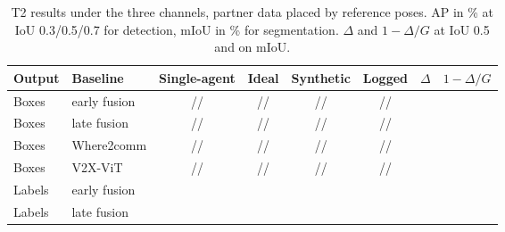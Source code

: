 \begin{table}[t]
\centering
\caption{T2 results under the three channels, partner data placed by
reference poses. AP in \% at IoU 0.3/0.5/0.7 for detection, mIoU in
\% for segmentation. $\Delta$ and $1-\Delta/G$ at IoU 0.5 and on
mIoU.}
\label{tab:res_t2}
\footnotesize
\setlength{\tabcolsep}{4pt}
\begin{tabular}{@{}ll cccc cc@{}}
\toprule
Output & Baseline & Single-agent & Ideal & Synthetic & Logged & $\Delta$ & $1-\Delta/G$ \\
\midrule
Boxes  & early fusion  & \todo{}/\todo{}/\todo{} & \todo{}/\todo{}/\todo{} & \todo{}/\todo{}/\todo{} & \todo{}/\todo{}/\todo{} & \todo{} & \todo{} \\
Boxes  & late fusion   & \todo{}/\todo{}/\todo{} & \todo{}/\todo{}/\todo{} & \todo{}/\todo{}/\todo{} & \todo{}/\todo{}/\todo{} & \todo{} & \todo{} \\
Boxes  & Where2comm    & \todo{}/\todo{}/\todo{} & \todo{}/\todo{}/\todo{} & \todo{}/\todo{}/\todo{} & \todo{}/\todo{}/\todo{} & \todo{} & \todo{} \\
Boxes  & V2X-ViT       & \todo{}/\todo{}/\todo{} & \todo{}/\todo{}/\todo{} & \todo{}/\todo{}/\todo{} & \todo{}/\todo{}/\todo{} & \todo{} & \todo{} \\
Labels & early fusion  & \todo{} & \todo{} & \todo{} & \todo{} & \todo{} & \todo{} \\
Labels & late fusion   & \todo{} & \todo{} & \todo{} & \todo{} & \todo{} & \todo{} \\
\bottomrule
\end{tabular}
\end{table}
